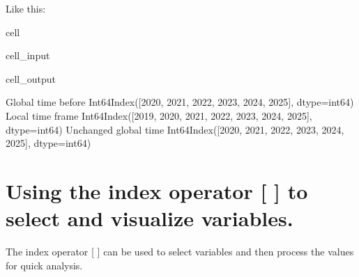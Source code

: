 \documentclass[letterpaper,10pt,english]{jupyterBook}
\begin{document}
\sphinxAtStartPar
Like this:

\begin{sphinxuseclass}{cell}\begin{sphinxVerbatimInput}

\begin{sphinxuseclass}{cell_input}
\begin{sphinxVerbatim}[commandchars=\\\{\}]
  
\end{sphinxVerbatim}

\end{sphinxuseclass}\end{sphinxVerbatimInput}
\begin{sphinxVerbatimOutput}

\begin{sphinxuseclass}{cell_output}
\begin{sphinxVerbatim}[commandchars=\\\{\}]
Global time  before   Int64Index([2020, 2021, 2022, 2023, 2024, 2025], dtype=\PYGZsq{}int64\PYGZsq{})
Local time frame      Int64Index([2019, 2020, 2021, 2022, 2023, 2024, 2025], dtype=\PYGZsq{}int64\PYGZsq{})
Unchanged global time Int64Index([2020, 2021, 2022, 2023, 2024, 2025], dtype=\PYGZsq{}int64\PYGZsq{})
\end{sphinxVerbatim}

\end{sphinxuseclass}\end{sphinxVerbatimOutput}

\end{sphinxuseclass}

\section{Using the index operator {[} {]} to select and visualize variables.}
\label{\detokenize{content/Python/modelflow_features:using-the-index-operator-to-select-and-visualize-variables}}\label{\detokenize{content/Python/modelflow_features:index-operator}}
\sphinxAtStartPar
The index operator {[} {]} can be used to select variables and then process the values for quick analysis.
\end{document}
